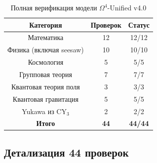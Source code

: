 \documentclass[12pt,a4paper,twoside]{article}
\newcommand{\checkmarkgreen}{\textcolor{emerald}{\checkmark}}
\theoremstyle{definition}
\begin{document}
\begin{table}[H]
\centering
\small
\caption{Полная верификация модели $\Omega^4$-Unified v4.0}
\label{tab:full_validation}
\begin{tabular}{c|c|c}
\toprule
\textbf{Категория} & \textbf{Проверок} & \textbf{Статус} \\
\midrule
Математика & 12 & \checkmarkgreen 12/12 \\
Физика (включая seesaw) & 10 & \checkmarkgreen 10/10 \\
Космология & 5 & \checkmarkgreen 5/5 \\
Групповая теория & 7 & \checkmarkgreen 7/7 \\
Квантовая теория поля & 3 & \checkmarkgreen 3/3 \\
Квантовая гравитация & 5 & \checkmarkgreen 5/5 \\
Yukawa из CY$_3$ & 2 & \checkmarkgreen 2/2 \\
\midrule
\textbf{Итого} & \textbf{44} & \textbf{\checkmarkgreen 44/44} \\
\bottomrule
\end{tabular}
\end{table}

\subsection{Детализация 44 проверок}
\end{document}
